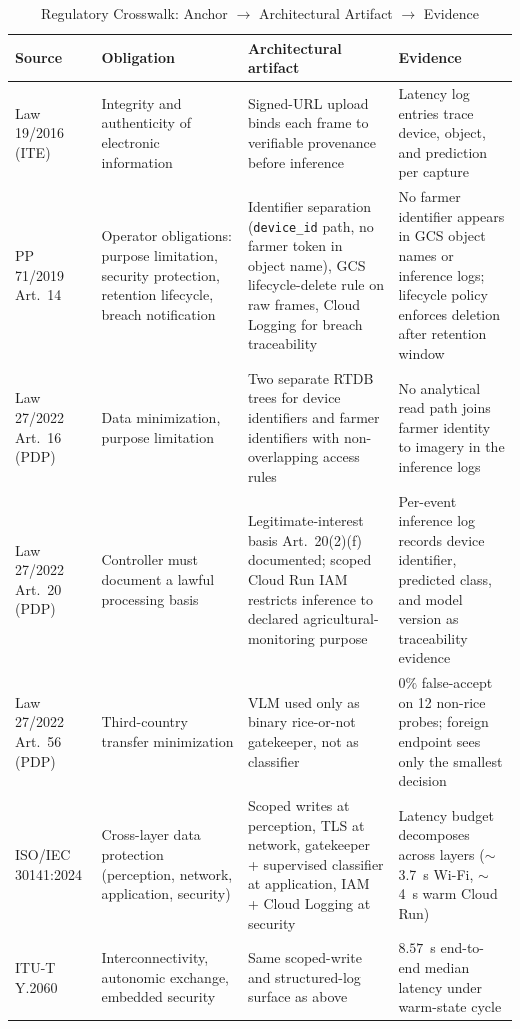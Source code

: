 \documentclass[conference]{IEEEtran}
\begin{document}
\begin{table}[t]
\caption{Regulatory Crosswalk: Anchor $\to$ Architectural Artifact $\to$ Evidence}
\label{tab:gov}
\scriptsize
\renewcommand{\arraystretch}{1.2}
\setlength{\tabcolsep}{4pt}
\begin{tabularx}{\textwidth}{|>{\raggedright\arraybackslash}p{2.4cm}|>{\raggedright\arraybackslash}X|>{\raggedright\arraybackslash}X|>{\raggedright\arraybackslash}X|}
\hline
\textbf{Source} & \textbf{Obligation} & \textbf{Architectural artifact} & \textbf{Evidence} \\
\hline
Law 19/2016 (ITE) & Integrity and authenticity of electronic information & Signed-URL upload binds each frame to verifiable provenance before inference & Latency log entries trace device, object, and prediction per capture \\
\hline
PP 71/2019 Art.~14 & Operator obligations: purpose limitation, security protection, retention lifecycle, breach notification & Identifier separation (\texttt{device\_id} path, no farmer token in object name), GCS lifecycle-delete rule on raw frames, Cloud Logging for breach traceability & No farmer identifier appears in GCS object names or inference logs; lifecycle policy enforces deletion after retention window \\
\hline
Law 27/2022 Art.~16 (PDP) & Data minimization, purpose limitation & Two separate RTDB trees for device identifiers and farmer identifiers with non-overlapping access rules & No analytical read path joins farmer identity to imagery in the inference logs \\
\hline
Law 27/2022 Art.~20 (PDP) & Controller must document a lawful processing basis & Legitimate-interest basis Art.~20(2)(f) documented; scoped Cloud Run IAM restricts inference to declared agricultural-monitoring purpose & Per-event inference log records device identifier, predicted class, and model version as traceability evidence \\
\hline
Law 27/2022 Art.~56 (PDP) & Third-country transfer minimization & VLM used only as binary rice-or-not gatekeeper, not as classifier & $0\%$ false-accept on 12 non-rice probes; foreign endpoint sees only the smallest decision \\
\hline
ISO/IEC 30141:2024 & Cross-layer data protection (perception, network, application, security) & Scoped writes at perception, TLS at network, gatekeeper + supervised classifier at application, IAM + Cloud Logging at security & Latency budget decomposes across layers ($\sim$3.7~s Wi-Fi, $\sim$4~s warm Cloud Run) \\
\hline
ITU-T Y.2060 & Interconnectivity, autonomic exchange, embedded security & Same scoped-write and structured-log surface as above & $8.57$~s end-to-end median latency under warm-state cycle \\
\hline
\end{tabularx}
\end{table}
\end{document}
